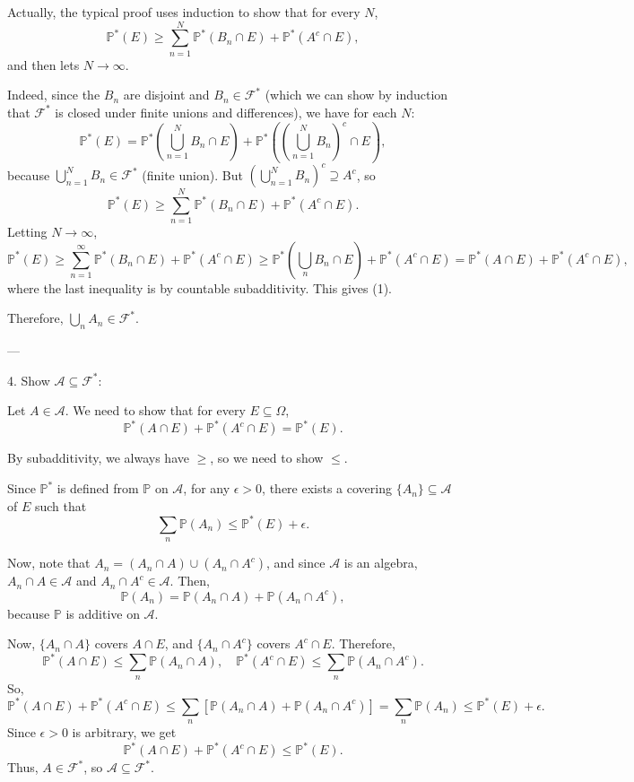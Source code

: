 \documentclass{article}
\newcommand{\1}{\mathds{1}}
\begin{document}
Actually, the typical proof uses induction to show that for every \(N\),
\[
\mathbb{P}^*(E) \geq \sum_{n=1}^N \mathbb{P}^*(B_n \cap E) + \mathbb{P}^*(A^c \cap E),
\]
and then lets \(N \to \infty\).

Indeed, since the \(B_n\) are disjoint and \(B_n \in \mathcal{F}^*\) (which we can show by induction that \(\mathcal{F}^*\) is closed under finite unions and differences), we have for each \(N\):
\[
\mathbb{P}^*(E) = \mathbb{P}^*\left( \bigcup_{n=1}^N B_n \cap E \right) + \mathbb{P}^*\left( \left( \bigcup_{n=1}^N B_n \right)^c \cap E \right),
\]
because \(\bigcup_{n=1}^N B_n \in \mathcal{F}^*\) (finite union). But \(\left( \bigcup_{n=1}^N B_n \right)^c \supseteq A^c\), so
\[
\mathbb{P}^*(E) \geq \sum_{n=1}^N \mathbb{P}^*(B_n \cap E) + \mathbb{P}^*(A^c \cap E).
\]
Letting \(N \to \infty\),
\[
\mathbb{P}^*(E) \geq \sum_{n=1}^\infty \mathbb{P}^*(B_n \cap E) + \mathbb{P}^*(A^c \cap E) \geq \mathbb{P}^*\left( \bigcup_n B_n \cap E \right) + \mathbb{P}^*(A^c \cap E) = \mathbb{P}^*(A \cap E) + \mathbb{P}^*(A^c \cap E),
\]
where the last inequality is by countable subadditivity. This gives (1).

Therefore, \(\bigcup_n A_n \in \mathcal{F}^*\).

---

       4. Show \(\mathcal{A} \subseteq \mathcal{F}^*\):

Let \(A \in \mathcal{A}\). We need to show that for every \(E \subseteq \Omega\),
\[
\mathbb{P}^*(A \cap E) + \mathbb{P}^*(A^c \cap E) = \mathbb{P}^*(E).
\]

By subadditivity, we always have \(\geq\), so we need to show \(\leq\).

Since \(\mathbb{P}^*\) is defined from \(\mathbb{P}\) on \(\mathcal{A}\), for any \(\epsilon > 0\), there exists a covering \(\{A_n\} \subseteq \mathcal{A}\) of \(E\) such that
\[
\sum_n \mathbb{P}(A_n) \leq \mathbb{P}^*(E) + \epsilon.
\]

Now, note that \(A_n = (A_n \cap A) \cup (A_n \cap A^c)\), and since \(\mathcal{A}\) is an algebra, \(A_n \cap A \in \mathcal{A}\) and \(A_n \cap A^c \in \mathcal{A}\). Then,
\[
\mathbb{P}(A_n) = \mathbb{P}(A_n \cap A) + \mathbb{P}(A_n \cap A^c),
\]
because \(\mathbb{P}\) is additive on \(\mathcal{A}\).

Now, \(\{A_n \cap A\}\) covers \(A \cap E\), and \(\{A_n \cap A^c\}\) covers \(A^c \cap E\). Therefore,
\[
\mathbb{P}^*(A \cap E) \leq \sum_n \mathbb{P}(A_n \cap A), \quad \mathbb{P}^*(A^c \cap E) \leq \sum_n \mathbb{P}(A_n \cap A^c).
\]
So,
\[
\mathbb{P}^*(A \cap E) + \mathbb{P}^*(A^c \cap E) \leq \sum_n [\mathbb{P}(A_n \cap A) + \mathbb{P}(A_n \cap A^c)] = \sum_n \mathbb{P}(A_n) \leq \mathbb{P}^*(E) + \epsilon.
\]
Since \(\epsilon > 0\) is arbitrary, we get
\[
\mathbb{P}^*(A \cap E) + \mathbb{P}^*(A^c \cap E) \leq \mathbb{P}^*(E).
\]
Thus, \(A \in \mathcal{F}^*\), so \(\mathcal{A} \subseteq \mathcal{F}^*\).
\end{document}
